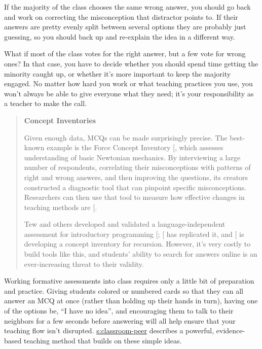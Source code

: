 If the majority of the class chooses the same wrong answer, you should
go back and work on correcting the misconception that distractor points
to. If their answers are pretty evenly split between several options
they are probably just guessing, so you should back up and re-explain
the idea in a different way.

What if most of the class votes for the right answer, but a few vote for
wrong ones? In that case, you have to decide whether you should spend
time getting the minority caught up, or whether it's more important to
keep the majority engaged. No matter how hard you work or what teaching
practices you use, you won't always be able to give everyone what they
need; it's your responsibility as a teacher to make the call.

\begin{quote}\setlength{\parindent}{0pt}
\textbf{Concept Inventories}

Given enough data, MCQs can be made surprisingly precise. The
best-known example is the Force Concept Inventory {[}\protect[\hyperlink{b:Hest1992}{Hest1992}]{]},
which assesses understanding of basic Newtonian mechanics. By
interviewing a large number of respondents, correlating their
misconceptions with patterns of right and wrong answers, and then
improving the questions, its creators constructed a diagnostic tool
that can pinpoint specific misconceptions. Researchers can then use
that tool to measure how effective changes in teaching methods are
{[}\protect[\hyperlink{b:Hake1998}{Hake1998}]{]}.

Tew and others developed and validated a language-independent
assessment for introductory programming {[}\protect[\hyperlink{b:Tew2011}{Tew2011}]{]};
{[}\protect[\hyperlink{b:Park2016}{Park2016}]{]} has replicated it, and {[}\protect[\hyperlink{b:Hamo2017}{Hamo2017}]{]} is
developing a concept inventory for recursion. However, it's very
costly to build tools like this, and students' ability to search for
answers online is an ever-increasing threat to their validity.
\end{quote}

Working formative assessments into class requires only a little bit of
preparation and practice. Giving students colored or numbered cards so
that they can all answer an MCQ at once (rather than holding up their
hands in turn), having one of the options be, ``I have no idea'', and
encouraging them to talk to their neighbors for a few seconds before
answering will all help ensure that your teaching flow isn't disrupted.
\protect\hyperlink{SECTION}{s:classroom-peer} describes a powerful, evidence-based
teaching method that builds on these simple ideas.

